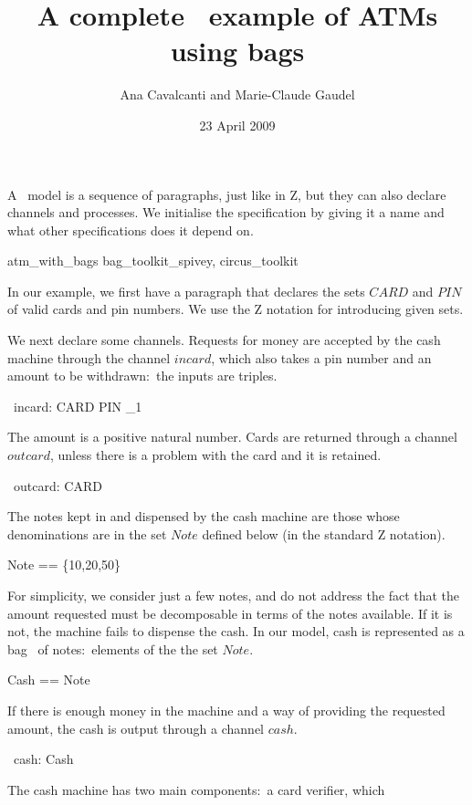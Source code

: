 \documentclass{article}
\title{A complete \Circus\ example of ATMs using bags}
\author{Ana Cavalcanti
        and
        Marie-Claude Gaudel}
\date{23 April 2009}
\begin{document}
\maketitle

A \Circus\ model is a sequence of paragraphs, just like in Z, but they can also declare channels
and processes. We initialise the specification by giving it a name and what other specifications
does it depend on.
\begin{zsection}
  \SECTION atm\_with\_bags \parents bag\_toolkit\_spivey, circus\_toolkit
\end{zsection}

In our example, we first have a paragraph that declares the sets
$CARD$ and $PIN$ of valid cards and pin numbers.  We use the Z
notation for introducing given sets.
\begin{zed}
\end{zed}
We next declare some channels.  Requests for money are accepted by
the cash machine through the channel $incard$, which also takes a pin
number and an amount to be withdrawn:~the inputs are triples.
\begin{circus}
  \circchannel\ incard: CARD \cross PIN \cross \nat_1
\end{circus}
The amount is a positive natural number.  Cards are returned through
a channel $outcard$, unless there is a problem with the card and it
is retained.
\begin{circus}
  \circchannel\ outcard: CARD
\end{circus}
The notes kept in and dispensed by the cash machine are those whose
denominations are in the set $Note$ defined below (in the standard Z
notation).
\begin{zed}
  Note == \{10,20,50\}
\end{zed}
For simplicity, we consider just a few notes, and do not address the
fact that the amount requested must be decomposable in terms of the
notes available.  If it is not, the machine fails to dispense the
cash. In our model, cash is represented as a bag~\cite{Spi92} of
notes:~elements of the the set $Note$.
\begin{zed}
  Cash == \bag Note
\end{zed}
If there is enough money in the machine and a way of providing the
requested amount, the cash is output through a channel $cash$.
\begin{circus}
  \circchannel\ cash: Cash
\end{circus}
The cash machine has two main components:~a card verifier, which
\end{document}
